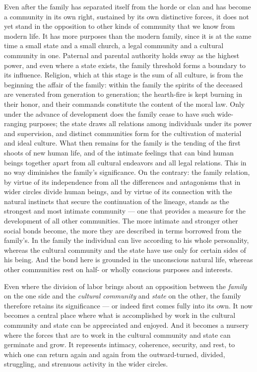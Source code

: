 \documentclass[12pt,a4paper]{article}
\begin{document}
Even after the family has separated itself from the horde or clan and
has become a community in its own right, sustained by its own
distinctive forces, it does not yet stand in the opposition to other
kinds of community that we know from modern life. It has more
purposes than the modern family, since it is at the same time a small
state and a small church, a legal community and a cultural community
in one. Paternal and parental authority holds sway as the highest
power, and even where a state exists, the family threshold forms a
boundary to its influence. Religion, which at this stage is the sum of
all culture, is from the beginning the affair of the family: within the
family the spirits of the deceased are venerated from generation to
generation; the hearth-fire is kept burning in their honor, and their
commands constitute the content of the moral law. Only under the
advance of development does the family cease to have such wide-ranging
purposes; the state draws all relations among individuals under its
power and supervision, and distinct communities form for the
cultivation of material and ideal culture. What then remains for the
family is the tending of the first shoots of new human life, and of the
intimate feelings that can bind human beings together apart from all
cultural endeavors and all legal relations. This in no way diminishes
the family's significance. On the contrary: the family relation, by
virtue of its independence from all the differences and antagonisms
that in wider circles divide human beings, and by virtue of its
connection with the natural instincts that secure the continuation of
the lineage, stands as the strongest and most intimate community ---
one that provides a measure for the development of all other
communities. The more intimate and stronger other social bonds become,
the more they are described in terms borrowed from the family's. In
the family the individual can live according to his whole personality,
whereas the cultural community and the state have use only for certain
sides of his being. And the bond here is grounded in the unconscious
natural life, whereas other communities rest on half- or wholly
conscious purposes and interests.

Even where the division of labor brings about an opposition between the \emph{family} on the one side and the \emph{cultural community} and \emph{state} on the other, the family therefore retains its significance --- or indeed
first comes fully into its own. It now becomes a central place where
what is accomplished by work in the cultural community and state can
be appreciated and enjoyed. And it becomes a nursery where the forces
that are to work in the cultural community and state can germinate
and grow. It represents intimacy, coherence, security, and rest, to
which one can return again and again from the outward-turned, divided,
struggling, and strenuous activity in the wider circles.
\end{document}
